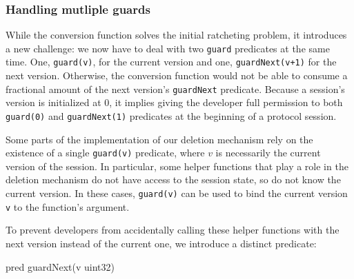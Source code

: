 \subsubsection{Handling mutliple guards}
\label{sec:handling-mutliple-guards}

While the conversion function solves the initial ratcheting problem, it introduces a new challenge: we now have to deal with two \texttt{guard} predicates at the same time. One, \texttt{guard(v)}, for the current version and one, \texttt{guardNext(v+1)} for the next version.
Otherwise, the conversion function would not be able to consume a fractional amount of the next version's \texttt{guardNext} predicate.
Because a session's version is initialized at $0$, it implies giving the developer full permission to both \texttt{guard(0)} and \texttt{guardNext(1)} predicates at the beginning of a protocol session.

Some parts of the implementation of our deletion mechanism rely on the existence of a single \texttt{guard(v)} predicate, where $v$ is necessarily the current version of the session.
In particular, some helper functions that play a role in the deletion mechanism do not have access to the session state, so do not know the current version.
In these cases, \texttt{guard(v)} can be used to bind the current version \texttt{v} to the function's argument.

To prevent developers from accidentally calling these helper functions with the next version instead of the current one, we introduce a distinct predicate:
\begin{gobra}
pred guardNext(v uint32)
\end{gobra}

